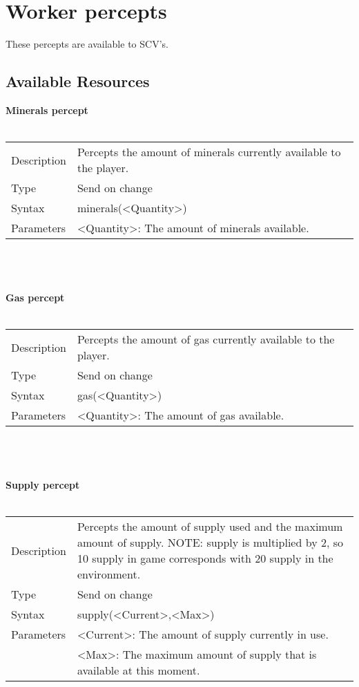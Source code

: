 \documentclass[english,11pt]{report}
\begin{document}
\newpage
\section{Worker percepts}
These percepts are available to SCV's.

\subsection{Available Resources}
\textbf{Minerals percept}\\
\\
\begin{tabularx}{\textwidth}{lX}
 Description & Percepts the amount of minerals currently available to the player. \\
 Type & Send on change \\
 Syntax & minerals(<Quantity>) \\
 Parameters &   <Quantity>: The amount of minerals available.
\end{tabularx}\\
\\
\\
\textbf{Gas percept}\\
\\
\begin{tabularx}{\textwidth}{lX}
 Description & Percepts the amount of gas currently available to the player. \\
 Type & Send on change \\
 Syntax & gas(<Quantity>) \\
 Parameters &   <Quantity>: The amount of gas available.
\end{tabularx}\\
\\
\\
\textbf{Supply percept}\\
\\
\begin{tabularx}{\textwidth}{lX}
 Description & Percepts the amount of supply used and the maximum amount of supply. NOTE: supply is multiplied by 2, so 10 supply in game corresponds with 20 supply in the environment. \\
 Type & Send on change \\
 Syntax & supply(<Current>,<Max>) \\
 Parameters &   <Current>: The amount of supply currently in use.\\
            &   <Max>: The maximum amount of supply that is available at this moment.
\end{tabularx}
\end{document}
